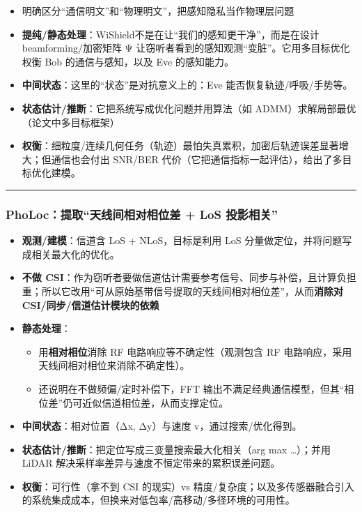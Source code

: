 \documentclass[
]{article}
\begin{document}
\begin{itemize}
\item
  明确区分``通信明文''和``物理明文''，把感知隐私当作物理层问题
\item
  \textbf{提纯/静态处理}：WiShield不是在让``我们的感知更干净''，而是在设计
  beamforming/加密矩阵 Ψ
  让窃听者看到的感知观测``变脏''。它用多目标优化权衡 Bob
  的通信与感知，以及 Eve 的感知能力。
\item
  \textbf{中间状态}：这里的``状态''是对抗意义上的：Eve
  能否恢复轨迹/呼吸/手势等。
\item
  \textbf{状态估计/推断}：它把系统写成优化问题并用算法（如
  ADMM）求解局部最优（论文中多目标框架）
\item
  \textbf{权衡}：细粒度/连续几何任务（轨迹）最怕失真累积，加密后轨迹误差显著增大；但通信也会付出
  SNR/BER 代价（它把通信指标一起评估），给出了多目标优化建模。
\end{itemize}

\begin{center}\rule{0.5\linewidth}{0.5pt}\end{center}

\subsubsection{PhoLoc：提取``天线间相对相位差 + LoS
投影相关''}\label{pholocux63d0ux53d6ux5929ux7ebfux95f4ux76f8ux5bf9ux76f8ux4f4dux5dee--los-ux6295ux5f71ux76f8ux5173}

\begin{itemize}
\item
  \textbf{观测/建模}：信道含 LoS + NLoS，目标是利用 LoS
  分量做定位，并将问题写成相关最大化的优化。
\item
  \textbf{不做
  CSI}：作为窃听者要做信道估计需要参考信号、同步与补偿，且计算负担重；所以它改用``可从原始基带信号提取的天线间相对相位差''，从而\textbf{消除对
  CSI/同步/信道估计模块的依赖}
\item
  \textbf{静态处理}：

  \begin{itemize}
  \item
    用\textbf{相对相位}消除 RF 电路响应等不确定性（观测包含 RF
    电路响应，采用天线间相对相位来消除不确定性）。
  \item
    还说明在不做频偏/定时补偿下，FFT
    输出不满足经典通信模型，但其``相位差''仍可近似信道相位差，从而支撑定位。
  \end{itemize}
\item
  \textbf{中间状态}：相对位置（Δx, Δy）与速度 v，通过搜索/优化得到。
\item
  \textbf{状态估计/推断}：把定位写成三变量搜索最大化相关（arg max
  \ldots）；并用 LiDAR 解决采样率差异与速度不恒定带来的累积误差问题。
\item
  \textbf{权衡}：可行性（拿不到 CSI 的现实）vs
  精度/复杂度；以及多传感器融合引入的系统集成成本，但换来对低包率/高移动/多径环境的可用性。
\end{itemize}
\end{document}
